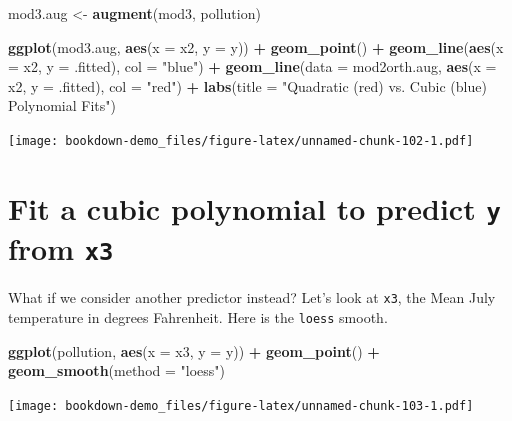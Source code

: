 \documentclass[]{book}
\newenvironment{Shaded}{\begin{snugshade}}{\end{snugshade}}
\newcommand{\KeywordTok}[1]{\textcolor[rgb]{0.13,0.29,0.53}{\textbf{#1}}}
\newcommand{\DataTypeTok}[1]{\textcolor[rgb]{0.13,0.29,0.53}{#1}}
\newcommand{\StringTok}[1]{\textcolor[rgb]{0.31,0.60,0.02}{#1}}
\newcommand{\OperatorTok}[1]{\textcolor[rgb]{0.81,0.36,0.00}{\textbf{#1}}}
\newcommand{\NormalTok}[1]{#1}
\theoremstyle{definition}
\theoremstyle{definition}
\theoremstyle{definition}
\theoremstyle{remark}
\begin{document}
\begin{Shaded}
\begin{Highlighting}[]
\NormalTok{mod3.aug <-}\StringTok{ }\KeywordTok{augment}\NormalTok{(mod3, pollution)}

\KeywordTok{ggplot}\NormalTok{(mod3.aug, }\KeywordTok{aes}\NormalTok{(}\DataTypeTok{x =}\NormalTok{ x2, }\DataTypeTok{y =}\NormalTok{ y)) }\OperatorTok{+}
\StringTok{    }\KeywordTok{geom_point}\NormalTok{() }\OperatorTok{+}
\StringTok{    }\KeywordTok{geom_line}\NormalTok{(}\KeywordTok{aes}\NormalTok{(}\DataTypeTok{x =}\NormalTok{ x2, }\DataTypeTok{y =}\NormalTok{ .fitted), }
              \DataTypeTok{col =} \StringTok{"blue"}\NormalTok{) }\OperatorTok{+}
\StringTok{    }\KeywordTok{geom_line}\NormalTok{(}\DataTypeTok{data =}\NormalTok{ mod2orth.aug, }\KeywordTok{aes}\NormalTok{(}\DataTypeTok{x =}\NormalTok{ x2, }\DataTypeTok{y =}\NormalTok{ .fitted),}
              \DataTypeTok{col =} \StringTok{"red"}\NormalTok{) }\OperatorTok{+}
\StringTok{    }\KeywordTok{labs}\NormalTok{(}\DataTypeTok{title =} \StringTok{"Quadratic (red) vs. Cubic (blue) Polynomial Fits"}\NormalTok{)}
\end{Highlighting}
\end{Shaded}

\texttt{[image: bookdown-demo\_files/figure-latex/unnamed-chunk-102-1.pdf]}

\section{\texorpdfstring{Fit a cubic polynomial to predict \texttt{y}
from
\texttt{x3}}{Fit a cubic polynomial to predict y from x3}}\label{fit-a-cubic-polynomial-to-predict-y-from-x3}

What if we consider another predictor instead? Let's look at
\texttt{x3}, the Mean July temperature in degrees Fahrenheit. Here is
the \texttt{loess} smooth.

\begin{Shaded}
\begin{Highlighting}[]
\KeywordTok{ggplot}\NormalTok{(pollution, }\KeywordTok{aes}\NormalTok{(}\DataTypeTok{x =}\NormalTok{ x3, }\DataTypeTok{y =}\NormalTok{ y)) }\OperatorTok{+}
\StringTok{    }\KeywordTok{geom_point}\NormalTok{() }\OperatorTok{+}
\StringTok{    }\KeywordTok{geom_smooth}\NormalTok{(}\DataTypeTok{method =} \StringTok{"loess"}\NormalTok{)}
\end{Highlighting}
\end{Shaded}

\texttt{[image: bookdown-demo\_files/figure-latex/unnamed-chunk-103-1.pdf]}
\end{document}
